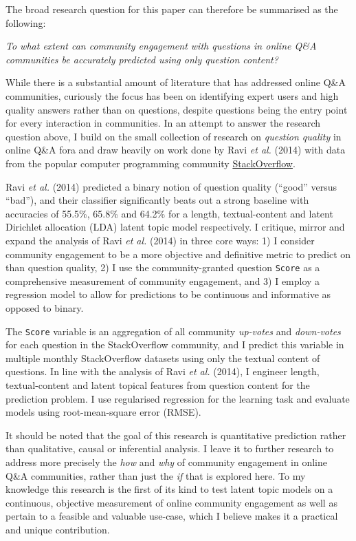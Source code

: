 \documentclass[11pt,preprint, authoryear]{article}
\begin{document}
The broad research question for this paper can therefore be summarised
as the following:

\begin{center}
\emph{To what extent can community engagement with questions in online Q\&A communities be accurately predicted using only question content?}
\end{center}

While there is a substantial amount of literature that has addressed
online Q\&A communities, curiously the focus has been on identifying
expert users and high quality answers rather than on questions, despite
questions being the entry point for every interaction in communities. In
an attempt to answer the research question above, I build on the small
collection of research on \emph{question quality} in online Q\&A fora
and draw heavily on work done by Ravi \emph{et al.} (2014) with data
from the popular computer programming community
\href{https://StackOverflow.com}{StackOverflow}.

Ravi \emph{et al.} (2014) predicted a binary notion of question quality
(``good'' versus ``bad''), and their classifier significantly beats out
a strong baseline with accuracies of 55.5\%, 65.8\% and 64.2\% for a
length, textual-content and latent Dirichlet allocation (LDA) latent
topic model respectively. I critique, mirror and expand the analysis of
Ravi \emph{et al.} (2014) in three core ways: 1) I consider community
engagement to be a more objective and definitive metric to predict on
than question quality, 2) I use the community-granted question
\texttt{Score} as a comprehensive measurement of community engagement,
and 3) I employ a regression model to allow for predictions to be
continuous and informative as opposed to binary.

The \texttt{Score} variable is an aggregation of all community
\emph{up-votes} and \emph{down-votes} for each question in the
StackOverflow community, and I predict this variable in multiple monthly
StackOverflow datasets using only the textual content of questions. In
line with the analysis of Ravi \emph{et al.} (2014), I engineer length,
textual-content and latent topical features from question content for
the prediction problem. I use regularised regression for the learning
task and evaluate models using root-mean-square error (RMSE).

It should be noted that the goal of this research is quantitative
prediction rather than qualitative, causal or inferential analysis. I
leave it to further research to address more precisely the \emph{how}
and \emph{why} of community engagement in online Q\&A communities,
rather than just the \emph{if} that is explored here. To my knowledge
this research is the first of its kind to test latent topic models on a
continuous, objective measurement of online community engagement as well
as pertain to a feasible and valuable use-case, which I believe makes it
a practical and unique contribution.
\end{document}
